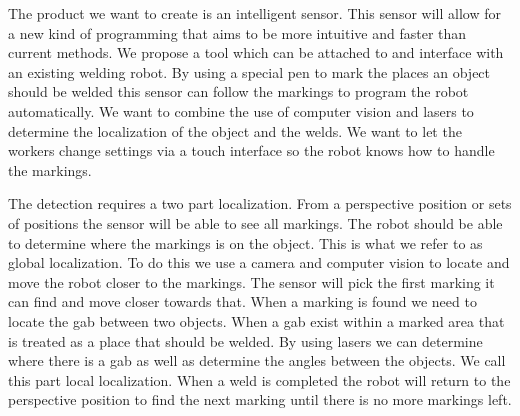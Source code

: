The product we want to create is an intelligent sensor.
This sensor will allow for a new kind of programming that aims to be more intuitive and faster than current methods.
We propose a tool which can be attached to and interface with an existing welding robot. 
By using a special pen to mark the places an object should be welded this sensor can follow the markings to program the robot automatically.
We want to combine the use of computer vision and lasers to determine the localization of the object and the welds.
We want to let the workers change settings via a touch interface so the robot knows how to handle the markings. 

The detection requires a two part localization. 
From a perspective position or sets of positions the sensor will be able to see all markings.
The robot should be able to determine where the markings is on the object. 
This is what we refer to as global localization.
To do this we use a camera and computer vision to locate and move the robot closer to the markings.
The sensor will pick the first marking it can find and move closer towards that. 
When a marking is found we need to locate the gab between two objects. 
When a gab exist within a marked area that is treated as a place that should be welded.
By using lasers we can determine where there is a gab as well as determine the angles between the objects.
We call this part local localization.
When a weld is completed the robot will return to the perspective position to find the next marking until there is no more markings left.